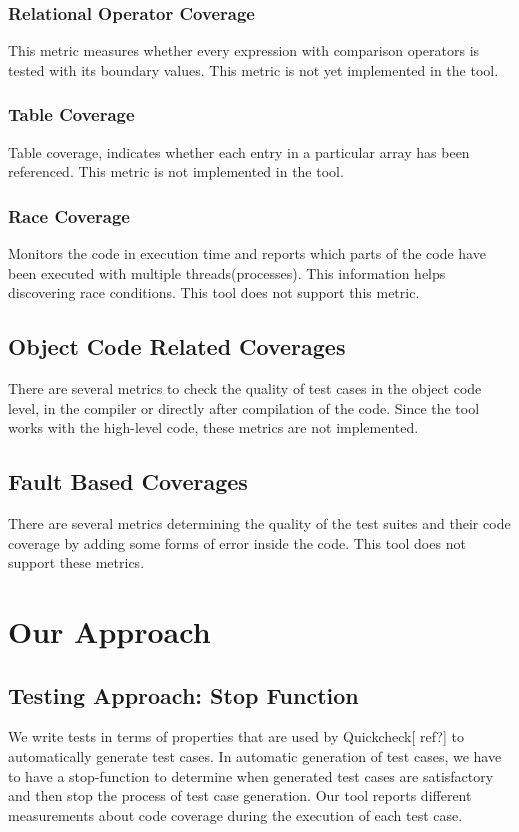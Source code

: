 \documentclass[12pt,a4paper]{report}
\begin{document}
\subsection{Relational Operator Coverage}
This metric measures whether every expression with comparison operators is tested with its boundary values.
This metric is not yet implemented in the tool.
 
\subsection{Table Coverage}
Table coverage, indicates whether each entry in a particular array has been referenced.\cite{andersson2005automatic}
This metric is not implemented in the tool.

\subsection{Race Coverage}
Monitors the code in execution time and reports which parts of the code have been executed with multiple threads(processes). This information helps discovering race conditions. 
This tool does not support this metric.

\section{Object Code Related Coverages}
There are several metrics to check the quality of test cases in the object code level, in the compiler or directly after compilation of the code.
Since the tool works with the high-level code, these metrics are not implemented.

\section{Fault Based Coverages}
There are several metrics determining the quality of the test suites and their code coverage by adding some forms of error inside the code.
This tool does not support these metrics.

\chapter{Our Approach}
\newpage
\section{Testing Approach: Stop Function}
We write tests in terms of properties that are used by Quickcheck[ ref?] to automatically generate test cases. In automatic generation of test cases, we
 have to have a stop-function to determine when generated test cases are satisfactory and then stop the process of test case generation. Our tool reports
 different measurements about code coverage during the execution of each test case. 
\end{document}
